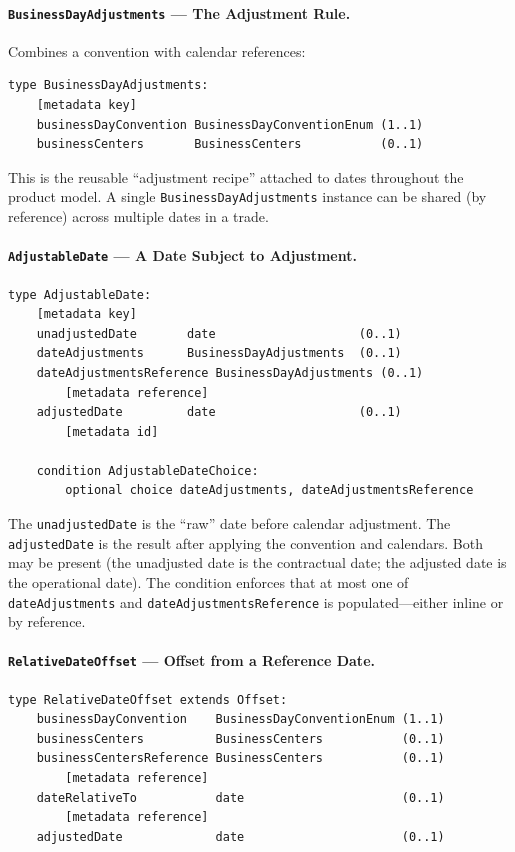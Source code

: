 \documentclass[11pt,a4paper]{article}
\begin{document}
\paragraph{\texttt{BusinessDayAdjustments} --- The Adjustment Rule.} Combines a convention with calendar references:

\begin{lstlisting}
type BusinessDayAdjustments:
    [metadata key]
    businessDayConvention BusinessDayConventionEnum (1..1)
    businessCenters       BusinessCenters           (0..1)
\end{lstlisting}

\noindent This is the reusable ``adjustment recipe'' attached to dates throughout the product model. A single \texttt{BusinessDayAdjustments} instance can be shared (by reference) across multiple dates in a trade.

\paragraph{\texttt{AdjustableDate} --- A Date Subject to Adjustment.}

\begin{lstlisting}
type AdjustableDate:
    [metadata key]
    unadjustedDate       date                    (0..1)
    dateAdjustments      BusinessDayAdjustments  (0..1)
    dateAdjustmentsReference BusinessDayAdjustments (0..1)
        [metadata reference]
    adjustedDate         date                    (0..1)
        [metadata id]

    condition AdjustableDateChoice:
        optional choice dateAdjustments, dateAdjustmentsReference
\end{lstlisting}

\noindent The \texttt{unadjustedDate} is the ``raw'' date before calendar adjustment. The \texttt{adjustedDate} is the result after applying the convention and calendars. Both may be present (the unadjusted date is the contractual date; the adjusted date is the operational date). The condition enforces that at most one of \texttt{dateAdjustments} and \texttt{dateAdjustmentsReference} is populated---either inline or by reference.

\paragraph{\texttt{RelativeDateOffset} --- Offset from a Reference Date.}

\begin{lstlisting}
type RelativeDateOffset extends Offset:
    businessDayConvention    BusinessDayConventionEnum (1..1)
    businessCenters          BusinessCenters           (0..1)
    businessCentersReference BusinessCenters           (0..1)
        [metadata reference]
    dateRelativeTo           date                      (0..1)
        [metadata reference]
    adjustedDate             date                      (0..1)
\end{lstlisting}
\end{document}
